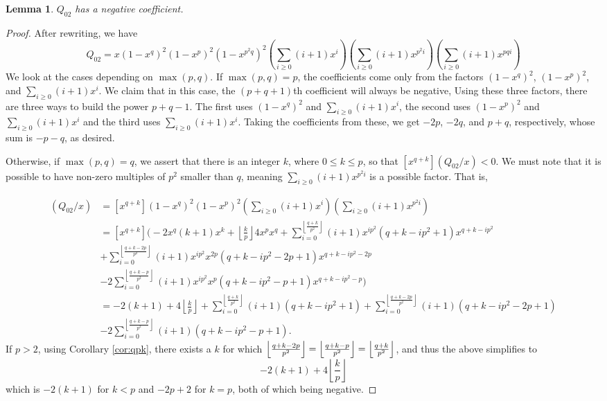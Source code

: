 \documentclass[11pt]{amsart}
\numberwithin{equation}{section}
\theoremstyle{plain}
\newtheorem{lemma}[equation]{Lemma}
\theoremstyle{definition}
\begin{document}





\begin{lemma} 
$Q_{02}$ has a negative coefficient.
\end{lemma}
\begin{proof}
After rewriting, we have
$$Q_{02}=x(1-x^q)^2(1-x^p)^2(1-x^{p^2q})^2\left(\sum_{i\geq 0}(i+1)x^i\right)\left(\sum_{i\geq 0}(i+1)x^{p^2i}\right)\left(\sum_{i\geq 0}(i+1)x^{pqi}\right)$$
We look at the cases depending on $\max(p,q)$. If $\max(p,q)=p$, the coefficients come only from the factors $(1-x^q)^2$, $(1-x^p)^2$, and $\displaystyle \sum_{i\geq 0}(i+1)x^{i}$. We claim that in this case, the $(p+q+1)$th coefficient will always be negative,
Using these three factors, there are three ways to build the power $p+q-1$. The first uses $(1-x^q)^2$ and $\displaystyle \sum_{i\geq 0}(i+1)x^{i}$, the second uses $(1-x^p)^2$ and $\displaystyle \sum_{i\geq 0}(i+1)x^{i}$ and the third uses $\displaystyle \sum_{i\geq 0}(i+1)x^{i}$. Taking the coefficients from these, we get $-2p$, $-2q$, and $p+q$, respectively, whose sum is $-p-q$, as desired. 

Otherwise, if $\max(p,q)=q$, we assert that there is an integer $k$, where $0\leq k \leq p$, so that $[x^{q+k}](Q_{02}/x)<0$. We must note that it is possible to have non-zero multiples of $p^2$ smaller than $q$, meaning $\displaystyle\sum_{i\geq 0}(i+1)x^{p^2i}$ is a possible factor. That is,

\begin{align*}
[x^{q+k}](Q_{02}/x) &= [x^{q+k}](1-x^q)^2(1-x^p)^2\left(\sum_{i\geq 0}(i+1)x^i\right) \left(\sum_{i\geq 0}(i+1)x^{p^2i}\right)\\
&=[x^{q+k}]\Bigg(-2x^q(k+1)x^k+\left\lfloor \frac{k}{p}\right\rfloor 4x^px^q+\sum_{i=0}^{\left\lfloor \frac{q+k}{p^2}\right\rfloor}(i+1)x^{ip^2}(q+k-ip^2+1)x^{q+k-ip^2} \\
&+ \sum_{i=0}^{\left\lfloor \frac{q+k-2p}{p^2}\right\rfloor}(i+1)x^{ip^2}x^{2p}(q+k-ip^2-2p+1)x^{q+k-ip^2-2p} \\
&- 2\sum_{i=0}^{\left\lfloor\frac{q+k-p}{p^2}\right\rfloor}(i+1)x^{ip^2}x^p(q+k-ip^2-p+1)x^{q+k-ip^2-p} \Bigg)\\
&=-2(k+1)+4\left\lfloor\frac{k}{p}\right\rfloor+\sum_{i=0}^{\left\lfloor\frac{q+k}{p^2}\right\rfloor}(i+1)(q+k-ip^2+1)+\sum_{i=0}^{\left\lfloor\frac{q+k-2p}{p^2}\right\rfloor}(i+1)(q+k-ip^2-2p+1)\\
&-2\sum_{i=0}^{\left\lfloor\frac{q+k-p}{p^2}\right\rfloor}(i+1)(q+k-ip^2-p+1).
\end{align*}
If $p>2$, using Corollary \ref{cor:qpk}, there exists a $k$ for which $\left\lfloor {q+k-2p\over p^2}\right\rfloor=\left\lfloor {q+k-p\over p^2}\right\rfloor=\left\lfloor {q+k\over p^2}\right\rfloor$, and thus  the above simplifies to
\[ -2(k+1)+4\left\lfloor\frac{k}{p}\right\rfloor\]
which is $-2(k+1)$ for $k<p$ and $-2p+2$ for $k=p$, both of which being negative.


\end{proof}
\end{document}
